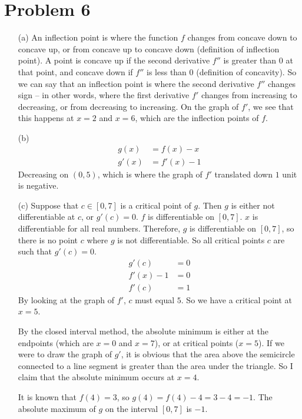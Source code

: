 \documentclass{article}
\newcommand*{\problem}[1]{\section*{Problem #1}}
\begin{document}
\problem{6}
\begin{itemize}
	\item[(a)]
	An inflection point is where the function $f$ changes from concave down to concave up, or from concave up to concave down (definition of inflection point). A point is concave up if the second derivative $f''$ is greater than $0$ at that point, and concave down if $f''$ is less than $0$ (definition of concavity). So we can say that an inflection point is where the second derivative $f''$ changes sign -- in other words, where the first derivative $f'$ changes from increasing to decreasing, or from decreasing to increasing. On the graph of $f'$, we see that this happens at $x=2$ and $x=6$, which are the inflection points of $f$.

	\item[(b)]
	\begin{align*}
		g(x)&=f(x)-x \\
		g'(x)&=f'(x)-1
	\end{align*}
	Decreasing on $(0,5)$, which is where the graph of $f'$ translated down $1$ unit is negative.

	\item[(c)]
	Suppose that $c\in[0,7]$ is a critical point of $g$. Then $g$ is either not differentiable at $c$, or $g'(c)=0$. $f$ is differentiable on $[0,7]$. $x$ is differentiable for all real numbers. Therefore, $g$ is differentiable on $[0,7]$, so there is no point $c$ where $g$ is not differentiable. So all critical points $c$ are such that $g'(c)=0$.
	\begin{align*}
		g'(c)&=0 \\
		f'(x)-1&=0 \\
		f'(c)&=1
	\end{align*}
	By looking at the graph of $f'$, $c$ must equal $5$. So we have a critical point at $x=5$.
	
	By the closed interval method, the absolute minimum is either at the endpoints (which are $x=0$ and $x=7$), or at critical points ($x=5$). If we were to draw the graph of $g'$, it is obvious that the area above the semicircle connected to a line segment is greater than the area under the triangle. So I claim that the absolute minimum occurs at $x=4$.

	It is known that $f(4)=3$, so $g(4)=f(4)-4=3-4=-1$. The absolute maximum of $g$ on the interval $[0,7]$ is $-1$.
\end{itemize}
\end{document}
